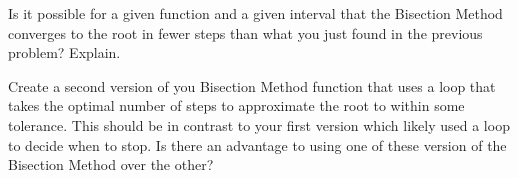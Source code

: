 
\begin{problem}
    Is it possible for a given function and a given interval that the Bisection Method
    converges to the root in fewer steps than what you just found in the previous problem?
    Explain.
\end{problem}

\begin{problem}
    Create a second version of you Bisection Method function that uses a  loop
    that takes the optimal number of steps to approximate the root to within some
    tolerance.  This should be in contrast to your first version which likely used a
     loop to decide when to stop.  Is there an advantage to using one of
    these version of the Bisection Method over the other?
\end{problem}

